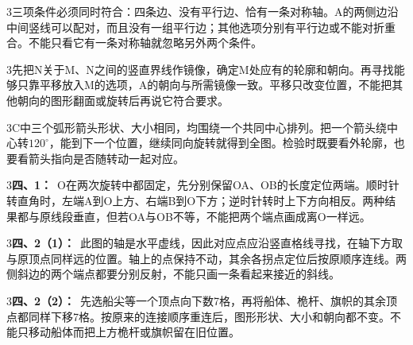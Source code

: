 \documentclass[multi=snippet,border={5bp 20bp 5bp 5bp}]{standalone}
\newenvironment{snippet}[3]{\begin{minipage}{#1bp}\color{answerred}\fontsize{#2}{#3}\selectfont\raggedright}{\end{minipage}}
\begin{document}
\begin{snippet}{505}{11.5}{14}\begin{multicols}{3}\raggedcolumns 三项条件必须同时符合：四条边、没有平行边、恰有一条对称轴。A的两侧边沿中间竖线可以配对，而且没有一组平行边；其他选项分别有平行边或不能对折重合。不能只看它有一条对称轴就忽略另外两个条件。\end{multicols}\end{snippet}
\begin{snippet}{505}{11.5}{14}\begin{multicols}{3}\raggedcolumns 先把N关于M、N之间的竖直界线作镜像，确定M处应有的轮廓和朝向。再寻找能够只靠平移放入M的选项，A的朝向与所需镜像一致。平移只改变位置，不能把其他朝向的图形翻面或旋转后再说它符合要求。\end{multicols}\end{snippet}
\begin{snippet}{505}{11.5}{14}\begin{multicols}{3}\raggedcolumns C中三个弧形箭头形状、大小相同，均围绕一个共同中心排列。把一个箭头绕中心转\(120^\circ\)\allowbreak ，能到下一个位置，继续同向旋转就得到全图。检验时既要看外轮廓，也要看箭头指向是否随转动一起对应。\end{multicols}\end{snippet}
\begin{snippet}{505}{11.5}{14}\begin{multicols}{3}\raggedcolumns \textbf{四、1：}\ O在两次旋转中都固定，先分别保留OA、OB的长度定位两端。顺时针转直角时，左端A到O上方、右端B到O下方；逆时针转时上下方向相反。两种结果都与原线段垂直，但若OA与OB不等，不能把两个端点画成离O一样远。\end{multicols}\end{snippet}
\begin{snippet}{505}{11.5}{14}\begin{multicols}{3}\raggedcolumns \textbf{四、2（1）：}\ 此图的轴是水平虚线，因此对应点应沿竖直格线寻找，在轴下方取与原顶点同样远的位置。轴上的点保持不动，其余各拐点定位后按原顺序连线。两侧斜边的两个端点都要分别反射，不能只画一条看起来接近的斜线。\end{multicols}\end{snippet}
\begin{snippet}{505}{11.5}{14}\begin{multicols}{3}\raggedcolumns \textbf{四、2（2）：}\ 先选船尖等一个顶点向下数7格，再将船体、桅杆、旗帜的其余顶点都同样下移7格。按原来的连接顺序重连后，图形形状、大小和朝向都不变。不能只移动船体而把上方桅杆或旗帜留在旧位置。\end{multicols}\end{snippet}
\end{document}
